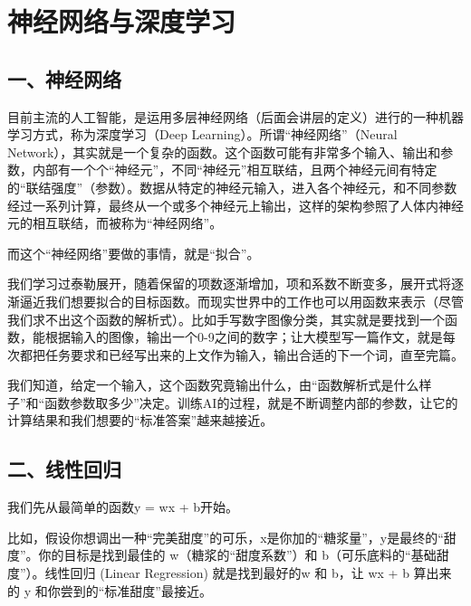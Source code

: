 \setcounter{section}{1}

\hypertarget{ux795eux7ecfux7f51ux7edcux4e0eux6df1ux5ea6ux5b66ux4e60}{%
\section{神经网络与深度学习}\label{ux795eux7ecfux7f51ux7edcux4e0eux6df1ux5ea6ux5b66ux4e60}}

\hypertarget{ux4e00ux795eux7ecfux7f51ux7edc}{%
\subsection{一、神经网络}\label{ux4e00ux795eux7ecfux7f51ux7edc}}

目前主流的人工智能，是运用多层神经网络（后面会讲层的定义）进行的一种机器学习方式，称为深度学习（Deep Learning）。所谓``神经网络''（Neural Network），其实就是一个复杂的函数。这个函数可能有非常多个输入、输出和参数，内部有一个个``神经元''，不同``神经元''相互联结，且两个神经元间有特定的``联结强度''（参数）。数据从特定的神经元输入，进入各个神经元，和不同参数经过一系列计算，最终从一个或多个神经元上输出，这样的架构参照了人体内神经元的相互联结，而被称为``神经网络''。

而这个``神经网络''要做的事情，就是``拟合''。

我们学习过泰勒展开，随着保留的项数逐渐增加，项和系数不断变多，展开式将逐渐逼近我们想要拟合的目标函数。而现实世界中的工作也可以用函数来表示（尽管我们求不出这个函数的解析式）。比如手写数字图像分类，其实就是要找到一个函数，能根据输入的图像，输出一个0-9之间的数字；让大模型写一篇作文，就是每次都把任务要求和已经写出来的上文作为输入，输出合适的下一个词，直至完篇。

我们知道，给定一个输入，这个函数究竟输出什么，由``函数解析式是什么样子''和``函数参数取多少''决定。训练AI的过程，就是不断调整内部的参数，让它的计算结果和我们想要的``标准答案''越来越接近。

\hypertarget{ux4e8cux7ebfux6027ux56deux5f52}{%
\subsection{二、线性回归}\label{ux4e8cux7ebfux6027ux56deux5f52}}

我们先从最简单的函数y = wx + b开始。

比如，假设你想调出一种``完美甜度''的可乐，x是你加的``糖浆量''，y是最终的``甜度''。你的目标是找到最佳的 w（糖浆的``甜度系数''）和 b（可乐底料的``基础甜度''）。线性回归 (Linear Regression) 就是找到最好的w 和 b，让 wx + b 算出来的 y 和你尝到的``标准甜度''最接近。


